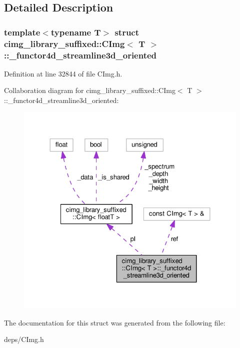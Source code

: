 \subsection{Detailed Description}
\subsubsection*{template$<$typename T$>$\newline
struct cimg\+\_\+library\+\_\+suffixed\+::\+C\+Img$<$ T $>$\+::\+\_\+functor4d\+\_\+streamline3d\+\_\+oriented}



Definition at line 32844 of file C\+Img.\+h.



Collaboration diagram for cimg\+\_\+library\+\_\+suffixed\+:\+:C\+Img$<$ T $>$\+:\+:\+\_\+functor4d\+\_\+streamline3d\+\_\+oriented\+:
\nopagebreak
\begin{figure}[H]
\begin{center}
\leavevmode
\includegraphics[width=324pt]{d8/d33/structcimg__library__suffixed_1_1CImg_1_1__functor4d__streamline3d__oriented__coll__graph}
\end{center}
\end{figure}


The documentation for this struct was generated from the following file\+:\begin{DoxyCompactItemize}
\item 
deps/C\+Img.\+h\end{DoxyCompactItemize}
